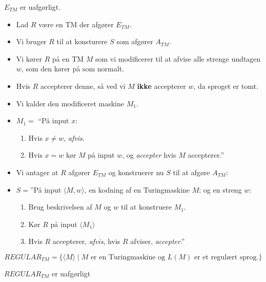 \begin{frame}[allowframebreaks]
	\begin{theorem}
		$E_{TM}$ er uafgørligt.
	\end{theorem}

	\begin{itemize}
		\item Lad $R$ være en TM der afgører $E_{TM}$.
		\item Vi bruger $R$ til at konsturere $S$ som afgører $A_{TM}$.
		\item Vi kører $R$ på en TM $M$ som vi modificerer til at afvise alle strenge undtagen $w$, som den kører på som normalt.
		\item Hvis $R$ accepterer denne, så ved vi $M$ \textbf{ikke} accepterer $w$, da sproget er tomt.
		\item Vi kalder den modificeret maskine $M_{1}$.
		\item $M_{1} = $ ``På input $x$:
		      \begin{enumerate}
			      \item Hvis $x \ne w$, \textit{afvis}.
			      \item Hvis $x = w$ kør $M$ på input $w$, og \textit{accepter} hvis $M$ accepterer.''
		      \end{enumerate}

		\item Vi antager at $R$ afgører $E_{TM}$ og konstruerer nu $S$ til at afgøre $A_{TM}$:
		\item $S = $''På input \(\langle M, w \rangle\), en kodning af en Turingmaskine $M$; og en streng $w$:
		      \begin{enumerate}
			      \item Brug beskrivelsen af $M$ og $w$ til at konstruere $M_{1}$.
			      \item Kør $R$ på input $\langle M_{1}\rangle$
			      \item Hvis $R$ accepterer, \textit{afvis}, hvis $R$ afviser, \textit{accepter}.''
		      \end{enumerate}
	\end{itemize}

	\begin{equation*}
		REGULAR_{TM} = \{\langle M \rangle \mid M \text{ er en Turingmaskine og } L(M) \text{ er et regulært sprog.}\}
	\end{equation*}

	\begin{theorem}
		$REGULAR_{TM}$ er uafgørligt
	\end{theorem}


\end{frame}
